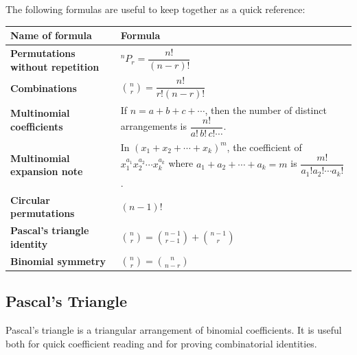 \documentclass[12pt]{article}
\begin{document}
The following formulas are useful to keep together as a quick reference:

\begin{center}
\renewcommand{\arraystretch}{1.35}
\begin{tabular}{|p{}|p{}|}
\hline
\textbf{Name of formula} & \textbf{Formula} \\
\hline
\textbf{Permutations without repetition} & ${}^{n}P_r = \dfrac{n!}{(n-r)!}$ \\
\hline
\textbf{Combinations} & $\binom{n}{r} = \dfrac{n!}{r!(n-r)!}$ \\
\hline
\textbf{Multinomial coefficients} & If $n=a+b+c+\cdots$, then the number of distinct arrangements is $\dfrac{n!}{a!\,b!\,c!\cdots}$. \\
\hline
\textbf{Multinomial expansion note} & In $(x_1+x_2+\cdots+x_k)^m$, the coefficient of $x_1^{a_1}x_2^{a_2}\cdots x_k^{a_k}$ where $a_1+a_2+\cdots+a_k=m$ is $\dfrac{m!}{a_1!a_2!\cdots a_k!}$. \\
\hline
\textbf{Circular permutations} & $(n-1)!$ \\
\hline
\textbf{Pascal's triangle identity} & $\binom{n}{r}=\binom{n-1}{r-1}+\binom{n-1}{r}$ \\
\hline
\textbf{Binomial symmetry} & $\binom{n}{r}=\binom{n}{n-r}$ \\
\hline
\end{tabular}
\end{center}

\subsection{Pascal's Triangle}
Pascal's triangle is a triangular arrangement of binomial coefficients. 
It is useful both for quick coefficient reading and for proving combinatorial identities.
\end{document}
